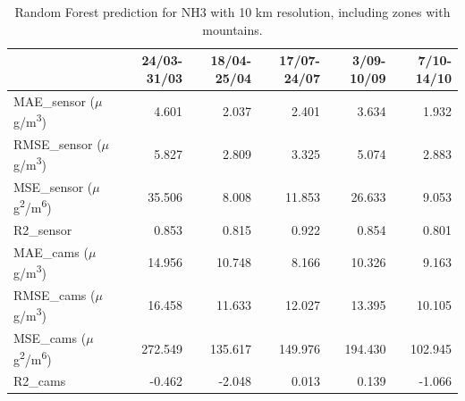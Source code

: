 \begin{table}[H]
\begin{tabular}{lrrrrr}
\toprule
  &  24/03-31/03 &  18/04-25/04 &  17/07-24/07 &  3/09-10/09 &  7/10-14/10 \\
\midrule
 MAE\_sensor ($\mu$g/m\textsuperscript{3})&        4.601 &        2.037 &        2.401 &       3.634 &       1.932 \\
RMSE\_sensor ($\mu$g/m\textsuperscript{3})&        5.827 &        2.809 &        3.325 &       5.074 &       2.883 \\
 MSE\_sensor ($\mu$g\textsuperscript{2}/m\textsuperscript{6})&       35.506 &        8.008 &       11.853 &      26.633 &       9.053 \\
  R2\_sensor &        0.853 &        0.815 &        0.922 &       0.854 &       0.801 \\
   MAE\_cams ($\mu$g/m\textsuperscript{3})&       14.956 &       10.748 &        8.166 &      10.326 &       9.163 \\
  RMSE\_cams ($\mu$g/m\textsuperscript{3})&       16.458 &       11.633 &       12.027 &      13.395 &      10.105 \\
   MSE\_cams ($\mu$g\textsuperscript{2}/m\textsuperscript{6})&      272.549 &      135.617 &      149.976 &     194.430 &     102.945 \\
    R2\_cams &       -0.462 &       -2.048 &        0.013 &       0.139 &      -1.066 \\
\bottomrule
\end{tabular}
\caption{Random Forest prediction for NH3 with 10 km resolution, including zones with mountains.}
\end{table}
